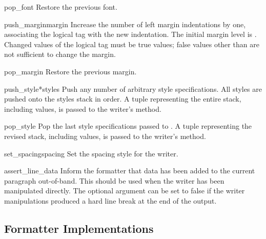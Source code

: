 \begin{methoddesc}[formatter]{pop_font}{}
Restore the previous font.
\end{methoddesc}

\begin{methoddesc}[formatter]{push_margin}{margin}
Increase the number of left margin indentations by one, associating
the logical tag  with the new indentation.  The initial
margin level is .  Changed values of the logical tag must be
true values; false values other than  are not
sufficient to change the margin.
\end{methoddesc}

\begin{methoddesc}[formatter]{pop_margin}{}
Restore the previous margin.
\end{methoddesc}

\begin{methoddesc}[formatter]{push_style}{*styles}
Push any number of arbitrary style specifications.  All styles are
pushed onto the styles stack in order.  A tuple representing the
entire stack, including  values, is passed to the
writer's  method.
\end{methoddesc}

\begin{methoddesc}[formatter]{pop_style}{}
Pop the last  style specifications passed to
.  A tuple representing the revised stack,
including  values, is passed to the writer's
 method.
\end{methoddesc}

\begin{methoddesc}[formatter]{set_spacing}{spacing}
Set the spacing style for the writer.
\end{methoddesc}

\begin{methoddesc}[formatter]{assert_line_data}{}
Inform the formatter that data has been added to the current paragraph
out-of-band.  This should be used when the writer has been manipulated
directly.  The optional  argument can be set to false if
the writer manipulations produced a hard line break at the end of the
output.
\end{methoddesc}


\subsection{Formatter Implementations}

